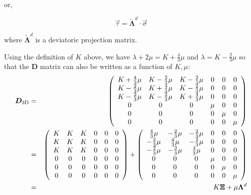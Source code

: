 or, 
\begin{mdframed}[backgroundcolor=blue!5]
\begin{equation}
\vec{\tau} = \tilde{\bm \Lambda}^d \cdot \vec{\sigma}
\label{eq:el:opla1}
\end{equation}
\end{mdframed}
where $\tilde{\bm \Lambda}^d$ is a deviatoric projection matrix.



Using the definition of $K$ above, 
we have $\lambda +2\mu = K + \frac43 \mu$
and $\lambda= K-\frac23 \mu$ so that the ${\bm D}$ matrix can also be written as a function of $K,\mu$:
\begin{eqnarray}
{\bm D}_{\rm 3D} 
&=& 
\left(
\begin{array}{cccccc}
K+\frac43 \mu & K-\frac23 \mu & K-\frac23 \mu & 0 & 0 & 0 \\ 
K-\frac23 \mu & K+\frac43 \mu & K-\frac23 \mu & 0 & 0 & 0 \\ 
K-\frac23 \mu & K-\frac23 \mu & K+\frac43 \mu & 0 & 0 & 0 \\
0 & 0 & 0 & \mu & 0 & 0 \\ 
0 & 0 & 0 & 0 & \mu & 0 \\ 
0 & 0 & 0 & 0 & 0 & \mu  
\end{array}
\right) \nonumber\\
&=& 
\left(
\begin{array}{cccccc}
K & K & K & 0 & 0 & 0 \\ 
K & K & K & 0 & 0 & 0 \\ 
K & K & K & 0 & 0 & 0 \\
0 & 0 & 0 & 0 & 0 & 0 \\ 
0 & 0 & 0 & 0 & 0 & 0 \\ 
0 & 0 & 0 & 0 & 0 & 0
\end{array}
\right)
+\left(
\begin{array}{cccccc}
 \frac43 \mu & -\frac23 \mu & -\frac23 \mu & 0 & 0 & 0 \\ 
-\frac23 \mu &  \frac43 \mu & -\frac23 \mu & 0 & 0 & 0 \\ 
-\frac23 \mu & -\frac23 \mu &  \frac43 \mu & 0 & 0 & 0 \\
0 & 0 & 0 & \mu & 0 & 0 \\ 
0 & 0 & 0 & 0 & \mu & 0 \\ 
0 & 0 & 0 & 0 & 0 & \mu  
\end{array}
\right)
\nonumber\\
&=& K {\bm \Xi} + \mu {\bm \Lambda}^d
\end{eqnarray}

